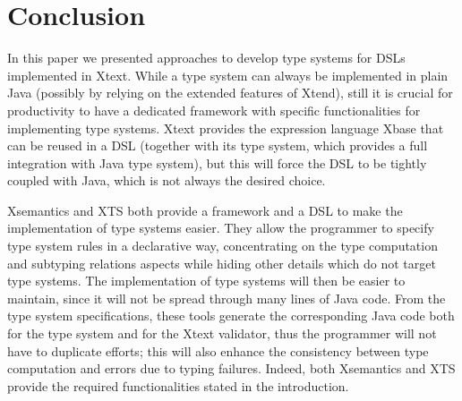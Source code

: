\section{Conclusion}
\label{sec:conclusion}

In this paper we presented approaches to develop type systems for DSLs
implemented in Xtext.  While a type system can always be implemented in plain
Java (possibly by relying on the extended features of Xtend), still it is
crucial for productivity to have a dedicated framework with specific
functionalities for implementing type systems.  Xtext provides the expression
language Xbase that can be reused in a DSL (together with its type system,
which provides a full integration with Java type system), but this will force
the DSL to be tightly coupled with Java, which is not always the desired choice.

Xsemantics and XTS both provide a framework and a DSL to make the implementation
of type systems easier.  They allow the programmer to specify type system
rules in a declarative way, concentrating on the type computation and subtyping
relations aspects while hiding other details which do not target type systems.
The implementation of type systems will then be easier to maintain, since it
will not be spread through many lines of Java code.  From the type system
specifications, these tools generate the corresponding Java code both for the type system and
for the Xtext validator, thus the programmer will not have to duplicate efforts;
this will also enhance the consistency between type computation and errors due
to typing failures.  Indeed, both Xsemantics and XTS provide the
required functionalities stated in the introduction.

